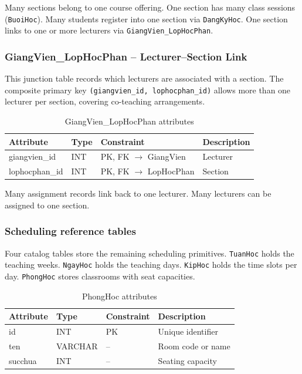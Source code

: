 \documentclass[12pt,a4paper]{report}
\begin{document}
Many sections belong to one course offering. One section has many class sessions (\texttt{BuoiHoc}). Many students register into one section via \texttt{DangKyHoc}. One section links to one or more lecturers via \texttt{GiangVien\_LopHocPhan}.

\subsubsection{GiangVien\_LopHocPhan -- Lecturer--Section Link}

This junction table records which lecturers are associated with a section. The composite primary key \texttt{(giangvien\_id, lophocphan\_id)} allows more than one lecturer per section, covering co-teaching arrangements.

\begin{table}[H]
\renewcommand{\arraystretch}{1.35}
\caption{GiangVien\_LopHocPhan attributes}
\label{tab:gv_lhp}
\begin{tabular}{|p{3cm}|p{2.5cm}|p{3cm}|p{5cm}|}
  \hline
  \textbf{Attribute} & \textbf{Type} & \textbf{Constraint} & \textbf{Description} \\
  \hline
  giangvien\_id & INT & PK, FK $\to$ GiangVien & Lecturer \\
  \hline
  lophocphan\_id & INT & PK, FK $\to$ LopHocPhan & Section \\
  \hline
\end{tabular}
\end{table}

Many assignment records link back to one lecturer. Many lecturers can be assigned to one section.

\subsubsection{Scheduling reference tables}

Four catalog tables store the remaining scheduling primitives. \texttt{TuanHoc} holds the teaching weeks. \texttt{NgayHoc} holds the teaching days. \texttt{KipHoc} holds the time slots per day. \texttt{PhongHoc} stores classrooms with seat capacities.

\begin{table}[H]
\renewcommand{\arraystretch}{1.35}
\caption{PhongHoc attributes}
\label{tab:phonghoc}
\begin{tabular}{|p{3cm}|p{2.5cm}|p{2.5cm}|p{5.5cm}|}
  \hline
  \textbf{Attribute} & \textbf{Type} & \textbf{Constraint} & \textbf{Description} \\
  \hline
  id & INT & PK & Unique identifier \\
  \hline
  ten & VARCHAR & -- & Room code or name \\
  \hline
  succhua & INT & -- & Seating capacity \\
  \hline
\end{tabular}
\end{table}
\end{document}
